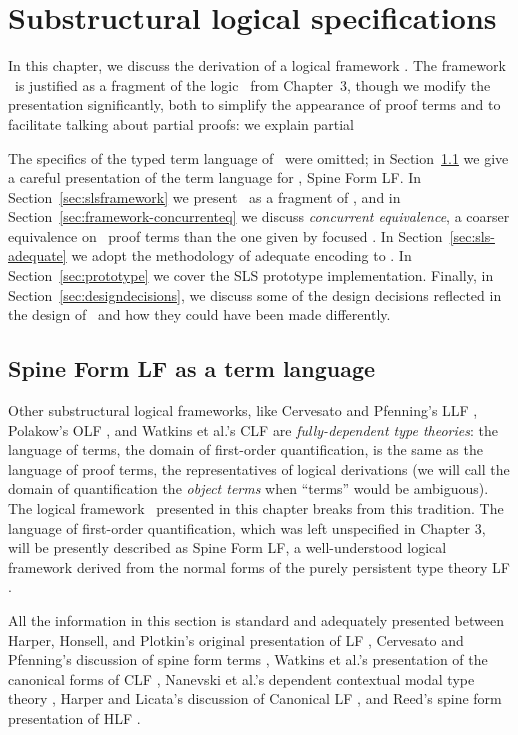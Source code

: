 \chapter{Substructural logical specifications}
\label{chapter-framework}

In this chapter, we discuss the derivation of a logical framework
\sls. The framework \sls~is justified as a fragment of the
logic \ollll~from Chapter~3, though we modify the presentation 
significantly, both to simplify the appearance of proof terms and to
facilitate talking about partial proofs: we explain partial 

The specifics of the typed term language of \ollll~were omitted; in
Section~\ref{sec:sls-termlanguage} we give a careful presentation of
the term language for \sls, Spine Form LF. In
Section~\ref{sec:slsframework} we present \sls~as a fragment of
\ollll, and in Section~\ref{sec:framework-concurrenteq} we discuss
{\it concurrent equivalence}, a coarser equivalence on \sls~proof
terms than the one given by focused \ollll. In
Section~\ref{sec:sls-adequate} we adopt the methodology of adequate
encoding to \sls. In Section~\ref{sec:prototype} we cover the SLS
prototype implementation. Finally, in
Section~\ref{sec:designdecisions}, we discuss some of the design
decisions reflected in the design of \sls~and how they could have been
made differently.

\section{Spine Form LF as a term language}
\label{sec:sls-termlanguage}

Other substructural logical frameworks, like Cervesato and Pfenning's
LLF \cite{cervesato02linear}, Polakow's OLF \cite{polakow01ordered},
and Watkins et al.'s CLF \cite{watkins02concurrent} are {\it
  fully-dependent type theories}: the language of terms, the domain of
first-order quantification, is the same as the language of proof
terms, the representatives of logical derivations (we will call the
domain of quantification the {\it object terms} when ``terms'' would
be ambiguous). The logical framework \sls~presented in this chapter
breaks from this tradition. The language of first-order
quantification, which was left unspecified in Chapter 3, will be
presently described as Spine Form LF, a well-understood logical
framework derived from the normal forms of the purely persistent type
theory LF \cite{harper93framework}.

All the information in this section is standard and adequately
presented between Harper, Honsell, and Plotkin's original presentation
of LF \cite{harper93framework}, Cervesato and Pfenning's discussion of
spine form terms \cite{cervesato02linear}, Watkins et al.'s
presentation of the canonical forms of CLF \cite{watkins02concurrent},
Nanevski et al.'s dependent contextual modal type theory
\cite{nanevski08contextual}, Harper and Licata's discussion of
Canonical LF \cite{harper07mechanizing}, and Reed's spine form
presentation of HLF \cite{reed09hybrid}. 

